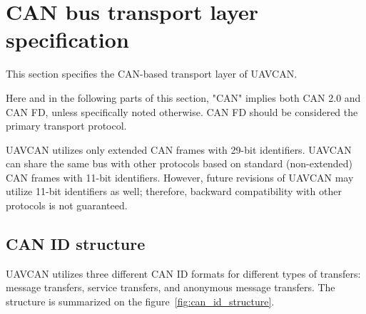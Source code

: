 \section{CAN bus transport layer specification}

This section specifies the CAN-based transport layer of UAVCAN.

Here and in the following parts of this section,
"CAN" implies both CAN 2.0 and CAN FD, unless specifically noted otherwise.
CAN FD should be considered the primary transport protocol.

UAVCAN utilizes only extended CAN frames with 29-bit identifiers.
UAVCAN can share the same bus with other protocols based on standard (non-extended) CAN frames with 11-bit identifiers.
However, future revisions of UAVCAN may utilize 11-bit identifiers as well;
therefore, backward compatibility with other protocols is not guaranteed.

\subsection{CAN ID structure}

UAVCAN utilizes three different CAN ID formats for different types of transfers:
message transfers, service transfers, and anonymous message transfers.
The structure is summarized on the figure~\ref{fig:can_id_structure}.

